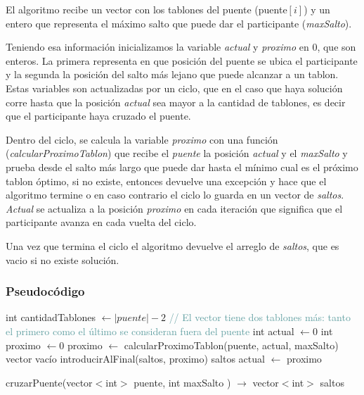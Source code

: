 El algoritmo recibe un vector con los tablones del puente (puente$[i]$) y un entero que representa el máximo salto que puede dar el participante (\textit{maxSalto}).

Teniendo esa informaci\'on inicializamos la variable \textit{actual} y \textit{proximo} en $0$, que son enteros. La primera representa en que posici\'on del puente se ubica el participante y la segunda la posici\'on del salto m\'as lejano que puede alcanzar a un tablon.
Estas variables son actualizadas por un ciclo, que en el caso que haya soluci\'on corre hasta que la posici\'on \textit{actual} sea mayor a la cantidad de tablones, es decir que el participante haya cruzado el puente.

Dentro del ciclo, se calcula la variable \textit{proximo} con una funci\'on (\textit{calcularProximoTablon}) que recibe el \textit{puente} la posici\'on \textit{actual} y el \textit{maxSalto} y prueba desde el salto m\'as largo que puede dar hasta el m\'inimo cual es el pr\'oximo tablon \'optimo, si no existe, entonces devuelve una excepci\'on y hace que el algoritmo termine o en caso contrario el ciclo lo guarda en un vector de \textit{saltos}.
\textit{Actual} se actualiza a la posici\'on \textit{proximo} en cada iteraci\'on que significa que el participante avanza en cada vuelta del ciclo.

Una vez que termina el ciclo el algoritmo devuelve el arreglo de \textit{saltos}, que es vacio si no existe soluci\'on.

\subsubsection{Pseudoc\'odigo}
\begin{algorithm}
\begin{algorithmic}
\STATE int cantidadTablones $\gets |puente| - 2$ \textcolor{CadetBlue}{// El vector tiene dos tablones más: tanto el primero como el último se consideran fuera del puente}
\STATE int actual $\gets 0$
\STATE int proximo $\gets 0$
    \STATE proximo $\gets$ calcularProximoTablon(puente, actual, maxSalto)
        \RETURN vector vacío
    \ENDIF
    \STATE introducirAlFinal(saltos, proximo)
        \RETURN saltos
    \ENDIF
    \STATE actual $\gets$ proximo
\ENDWHILE
\caption{cruzarPuente(vector$<$int$>$ puente, int maxSalto ) $\rightarrow$ vector$<$int$>$ saltos}
\end{algorithmic}
\end{algorithm}

